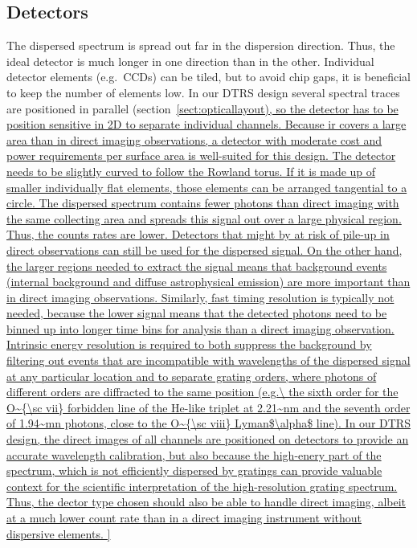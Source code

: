 \documentclass[linenumbers]{aastex631}
\begin{document}
{\subsection{Detectors}
The dispersed spectrum is spread out far in the dispersion direction. Thus, the ideal detector is much longer in one direction than in the other. Individual detector elements (e.g.\ CCDs) can be tiled, but to avoid chip gaps, it is beneficial to keep the number of elements low. In our DTRS design several spectral traces are positioned in parallel (section~\ref{sect:opticallayout), so the detector has to be position sensitive in 2D to separate individual channels.  Because ir covers a large area than in direct imaging observations, a detector with moderate cost and power requirements per surface area is well-suited for this design. The detector needs to be slightly curved to follow the Rowland torus. If it is made up of smaller individually flat elements, those elements can be arranged tangential to a circle.

The dispersed spectrum contains fewer photons than direct imaging with the same collecting area and spreads this signal out over a large physical region. Thus, the counts rates are lower. Detectors that might by at risk of pile-up in direct observations can still be used for the dispersed signal. On the other hand, the larger regions needed to extract the signal means that background events (internal background and diffuse astrophysical emission) are more important than in direct imaging observations. Similarly, fast timing resolution is typically not needed, because the lower signal means that the detected photons need to be binned up into longer time bins for analysis than a direct imaging observation. Intrinsic energy resolution is required to both suppress the background by filtering out events that are incompatible with wavelengths of the dispersed signal at any particular location and to separate grating orders, where photons of different orders are diffracted to the same position (e.g.\ the sixth order for the O~{\sc vii} forbidden line of the He-like triplet at 2.21~nm and the seventh order of 1.94~mn photons, close to the O~{\sc viii} Lyman$\alpha$ line).

In our DTRS design, the direct images of all channels are positioned on detectors to provide an accurate wavelength calibration, but also because the high-enery part of the spectrum, which is not efficiently dispersed by gratings can provide valuable context for the scientific interpretation of the high-resolution grating spectrum. Thus, the dector type chosen should also be able to handle direct imaging, albeit at a much lower count rate than in a direct imaging instrument without dispersive elements.

}}
\end{document}

